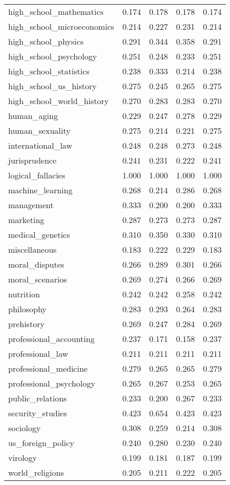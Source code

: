 \begin{tabular}{lrrrr}
high\_school\_mathematics & 0.174 & 0.178 & 0.178 & 0.174 \\
high\_school\_microeconomics & 0.214 & 0.227 & 0.231 & 0.214 \\
high\_school\_physics & 0.291 & 0.344 & 0.358 & 0.291 \\
high\_school\_psychology & 0.251 & 0.248 & 0.233 & 0.251 \\
high\_school\_statistics & 0.238 & 0.333 & 0.214 & 0.238 \\
high\_school\_us\_history & 0.275 & 0.245 & 0.265 & 0.275 \\
high\_school\_world\_history & 0.270 & 0.283 & 0.283 & 0.270 \\
human\_aging & 0.229 & 0.247 & 0.278 & 0.229 \\
human\_sexuality & 0.275 & 0.214 & 0.221 & 0.275 \\
international\_law & 0.248 & 0.248 & 0.273 & 0.248 \\
jurisprudence & 0.241 & 0.231 & 0.222 & 0.241 \\
logical\_fallacies & 1.000 & 1.000 & 1.000 & 1.000 \\
machine\_learning & 0.268 & 0.214 & 0.286 & 0.268 \\
management & 0.333 & 0.200 & 0.200 & 0.333 \\
marketing & 0.287 & 0.273 & 0.273 & 0.287 \\
medical\_genetics & 0.310 & 0.350 & 0.330 & 0.310 \\
miscellaneous & 0.183 & 0.222 & 0.229 & 0.183 \\
moral\_disputes & 0.266 & 0.289 & 0.301 & 0.266 \\
moral\_scenarios & 0.269 & 0.274 & 0.266 & 0.269 \\
nutrition & 0.242 & 0.242 & 0.258 & 0.242 \\
philosophy & 0.283 & 0.293 & 0.264 & 0.283 \\
prehistory & 0.269 & 0.247 & 0.284 & 0.269 \\
professional\_accounting & 0.237 & 0.171 & 0.158 & 0.237 \\
professional\_law & 0.211 & 0.211 & 0.211 & 0.211 \\
professional\_medicine & 0.279 & 0.265 & 0.265 & 0.279 \\
professional\_psychology & 0.265 & 0.267 & 0.253 & 0.265 \\
public\_relations & 0.233 & 0.200 & 0.267 & 0.233 \\
security\_studies & 0.423 & 0.654 & 0.423 & 0.423 \\
sociology & 0.308 & 0.259 & 0.214 & 0.308 \\
us\_foreign\_policy & 0.240 & 0.280 & 0.230 & 0.240 \\
virology & 0.199 & 0.181 & 0.187 & 0.199 \\
world\_religions & 0.205 & 0.211 & 0.222 & 0.205 \\
\bottomrule
\end{tabular}
